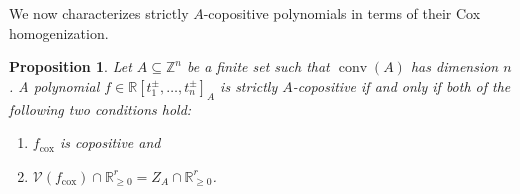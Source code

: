 \documentclass[a4paper,11pt]{amsart}
\newtheorem{proposition}[theorem]{Proposition}
\theoremstyle{definition}
\DeclareMathOperator{\conv}{conv}
\newcommand{\RR}{\mathbb{R}}
\newcommand{\cox}{\mathrm{cox}}
\begin{document}
We now characterizes strictly $A$-copositive polynomials in terms of their Cox homogenization.

\begin{proposition}
\label{prop:interiorCAcox}
Let $A \subseteq \mathbb{Z}^n$ be a finite set such that $\conv(A)$ has dimension $n$. 
  A polynomial $f \in \RR[t_1^\pm , \dots, t_n^\pm]_A$ is strictly $A$-copositive if and only if 
  both of the following two conditions hold: \begin{enumerate}
        \item[(i)] $f_\cox$ is copositive and
        \item[(ii)] $\mathcal{V}(f_\cox) \cap \RR^r_{\ge 0} = Z_A \cap \RR^r_{\ge 0}$.
    \end{enumerate}
\end{proposition}
\end{document}
